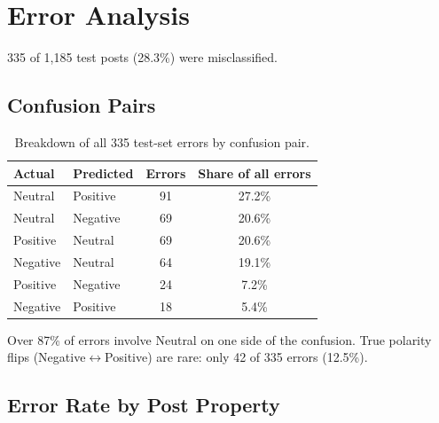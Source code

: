 \documentclass[11pt,a4paper]{article}
\begin{document}
\section{Error Analysis}

335 of 1{,}185 test posts (28.3\%) were misclassified.

\subsection{Confusion Pairs}

\begin{table}[H]
\centering
\small
\begin{tabular}{@{}llcc@{}}
\toprule
\textbf{Actual} & \textbf{Predicted} & \textbf{Errors} & \textbf{Share of all errors} \\
\midrule
Neutral & Positive & 91 & 27.2\% \\
Neutral & Negative & 69 & 20.6\% \\
Positive & Neutral & 69 & 20.6\% \\
Negative & Neutral & 64 & 19.1\% \\
Positive & Negative & 24 & 7.2\% \\
Negative & Positive & 18 & 5.4\% \\
\bottomrule
\end{tabular}
\caption{Breakdown of all 335 test-set errors by confusion pair.}
\end{table}

Over 87\% of errors involve Neutral on one side of the confusion. True polarity flips (Negative$\leftrightarrow$Positive) are rare: only 42 of 335 errors (12.5\%).

\subsection{Error Rate by Post Property}
\end{document}
